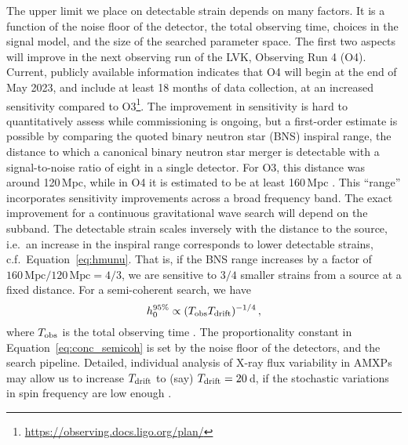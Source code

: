 The upper limit we place on detectable strain depends on many factors. It is a function of the noise floor of the detector, the total observing time, choices in the signal model, and the size of the searched parameter space. The first two aspects will improve in the next observing run of the LVK, Observing Run 4 (O4). Current, publicly available information indicates that O4 will begin at the end of May 2023, and include at least 18 months of data collection, at an increased sensitivity compared to O3\footnote{\url{https://observing.docs.ligo.org/plan/}}. The improvement in sensitivity is hard to quantitatively assess while commissioning is ongoing, but a first-order estimate is possible by comparing the quoted binary neutron star (BNS) inspiral range, the distance to which a canonical binary neutron star merger is detectable with a signal-to-noise ratio of eight in a single detector. For O3, this distance was around 120\,Mpc, while in O4 it is estimated to be at least 160\,Mpc \citep{Buikema2020}. This ``range'' incorporates sensitivity improvements across a broad frequency band. The exact improvement for a continuous gravitational wave search will depend on the subband. The detectable strain scales inversely with the distance to the source, i.e.~an increase in the inspiral range corresponds to lower detectable strains, c.f.~Equation~\eqref{eq:hmunu}. That is, if the BNS range increases by a factor of $160\,\textrm{Mpc} / 120\,\textrm{Mpc} = 4/3$, we are sensitive to $3/4$ smaller strains from a source at a fixed distance. For a semi-coherent search, we have 
\begin{equation}
    h_0^{95\%} \propto (T_{\rm obs} T_{\rm drift})^{-1/4}\,, \label{eq:conc_semicoh}
\end{equation}
where $T_{\rm obs}$ is the total observing time \citep{Sun2018}. The proportionality constant in Equation~\eqref{eq:conc_semicoh} is set by the noise floor of the detectors, and the search pipeline. Detailed, individual analysis of X-ray flux variability in AMXPs may allow us to increase $T_{\rm drift}$ to (say)  $T_{\rm drift} = 20\,$d, if the stochastic variations in spin frequency are low enough \citep{Melatos2023}. 

